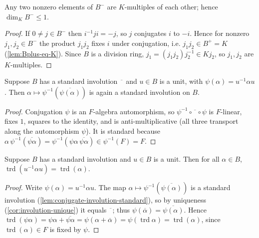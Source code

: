 \begin{lemma}
    \label{lem:Bminus-dim-one}
    Any two nonzero elements of $B^{-}$ are $K$-multiples of each other; hence
    $\dim_K B^{-} \leq 1$.
\end{lemma}
\begin{proof}
    If $0 \neq j \in B^{-}$ then $i^{-1}ji = -j$, so $j$ conjugates $i$ to $-i$.
    Hence for nonzero $j_1, j_2 \in B^{-}$ the product $j_1 j_2$ fixes $i$ under
    conjugation, i.e. $j_1 j_2 \in B^{+} = K$ (\ref{lem:Bplus-eq-K}). Since $B$ is
    a division ring, $j_1 = (j_1 j_2) j_2^{-1} \in K j_2$, so $j_1, j_2$ are
    $K$-multiples.
\end{proof}

\begin{lemma}
    \label{lem:conjugate-involution-standard}
    Suppose $B$ has a standard involution $\overline{\phantom{a}}$ and $u \in B$ is
    a unit, with $\psi(\alpha) = u^{-1}\alpha u$. Then
    $\alpha \mapsto \psi^{-1}(\overline{\psi(\alpha)})$ is again a standard involution
    on $B$.
\end{lemma}
\begin{proof}
    Conjugation $\psi$ is an $F$-algebra automorphism, so
    $\psi^{-1} \circ \overline{\phantom{a}} \circ \psi$ is $F$-linear, fixes $1$,
    squares to the identity, and is anti-multiplicative (all three transport along
    the automorphism $\psi$). It is standard because $\alpha\,
    \psi^{-1}(\overline{\psi\alpha}) = \psi^{-1}(\psi\alpha\,\overline{\psi\alpha})
    \in \psi^{-1}(F) = F$.
\end{proof}

\begin{lemma}
    \label{lem:trd-conjugation-invariant}
    Suppose $B$ has a standard involution and $u \in B$ is a unit. Then for all
    $\alpha \in B$, $\operatorname{trd}(u^{-1}\alpha u) = \operatorname{trd}(\alpha)$.
\end{lemma}
\begin{proof}
    Write $\psi(\alpha) = u^{-1}\alpha u$. The map
    $\alpha \mapsto \psi^{-1}(\overline{\psi(\alpha)})$ is a standard involution
    (\ref{lem:conjugate-involution-standard}), so by uniqueness
    (\ref{cor:involution-unique}) it equals $\overline{\phantom{a}}$; thus
    $\psi(\overline\alpha) = \overline{\psi(\alpha)}$. Hence
    $\operatorname{trd}(\psi\alpha) = \psi\alpha + \overline{\psi\alpha} =
    \psi(\alpha + \overline\alpha) = \psi(\operatorname{trd}\alpha) =
    \operatorname{trd}(\alpha)$, since $\operatorname{trd}(\alpha) \in F$ is fixed
    by $\psi$.
\end{proof}

